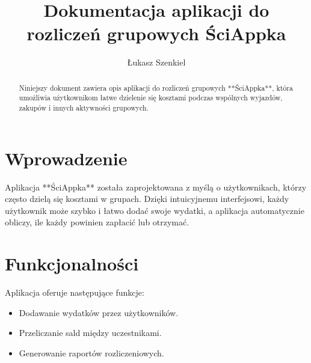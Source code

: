 \documentclass{article}
\title{Dokumentacja aplikacji do rozliczeń grupowych ŚciAppka}
\author{Łukasz Szenkiel}
\begin{document}
	
	\maketitle
	
	\begin{abstract}
		Niniejszy dokument zawiera opis aplikacji do rozliczeń grupowych **ŚciAppka**, która umożliwia użytkownikom łatwe dzielenie się kosztami podczas wspólnych wyjazdów, zakupów i innych aktywności grupowych.
	\end{abstract}
	
	\section{Wprowadzenie}
	Aplikacja **ŚciAppka** została zaprojektowana z myślą o użytkownikach, którzy często dzielą się kosztami w grupach. Dzięki intuicyjnemu interfejsowi, każdy użytkownik może szybko i łatwo dodać swoje wydatki, a aplikacja automatycznie obliczy, ile każdy powinien zapłacić lub otrzymać.
	
	\section{Funkcjonalności}
	Aplikacja oferuje następujące funkcje:
	\begin{itemize}
		\item Dodawanie wydatków przez użytkowników.
		\item Przeliczanie sald między uczestnikami.
		\item Generowanie raportów rozliczeniowych.
	\end{itemize}
	
\end{document}
